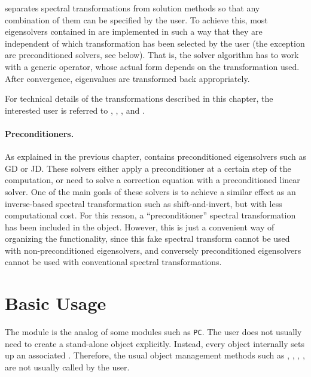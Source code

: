 	\slepc separates spectral transformations from solution methods so that any combination of them can be specified by the user. To achieve this, most eigensolvers contained in  are implemented in such a way that they are independent of which transformation has been selected by the user (the exception are preconditioned solvers, see below). That is, the solver algorithm has to work with a generic operator, whose actual form depends on the transformation used. After convergence, eigenvalues are transformed back appropriately. 

	For technical details of the transformations described in this chapter, the interested user is referred to \citep{Ericsson:1980:STL}, \citep{Scott:1982:AIO}, \citep{Nour-Omid:1987:HIS}, and \citep{Meerbergen:1994:SCT}.

\paragraph{Preconditioners.}

As explained in the previous chapter,  contains preconditioned eigensolvers such as GD or JD. These solvers either apply a preconditioner at a certain step of the computation, or need to solve a correction equation with a preconditioned linear solver. One of the main goals of these solvers is to achieve a similar effect as an inverse-based spectral transformation such as shift-and-invert, but with less computational cost. For this reason, a ``preconditioner'' spectral transformation has been included in the  object. However, this is just a convenient way of organizing the functionality, since this fake spectral transform cannot be used with non-preconditioned eigensolvers, and conversely preconditioned eigensolvers cannot be used with conventional spectral transformations.

\section{Basic Usage}

	The  module is the analog of some \petsc modules such as \texttt{PC}. The user does not usually need to create a stand-alone  object explicitly. Instead, every  object internally sets up an associated . Therefore, the usual object management methods such as , , , , are not usually called by the user.

